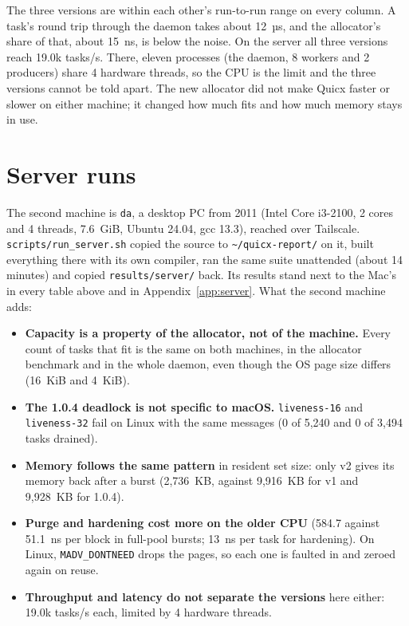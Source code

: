 \documentclass[10.5pt,a4paper]{article}
\newcommand{\file}[1]{\texttt{\small #1}}
\begin{document}
The three versions are within each other's run-to-run range on every column. A task's round trip through the daemon takes about 12~µs, and the allocator's share of that, about 15~ns, is below the noise. On the server all three versions reach 19.0k tasks/s. There, eleven processes (the daemon, 8 workers and 2 producers) share 4 hardware threads, so the CPU is the limit and the three versions cannot be told apart. The new allocator did not make Quicx faster or slower on either machine; it changed how much fits and how much memory stays in use.

\section{Server runs}\label{sec:server}

The second machine is \texttt{da}, a desktop PC from 2011 (Intel Core i3-2100, 2 cores and 4 threads, 7.6~GiB, Ubuntu 24.04, gcc 13.3), reached over Tailscale. \file{scripts/run\_server.sh} copied the source to \file{\textasciitilde/quicx-report/} on it, built everything there with its own compiler, ran the same suite unattended (about 14 minutes) and copied \file{results/server/} back. Its results stand next to the Mac's in every table above and in Appendix~\ref{app:server}. What the second machine adds:
\begin{itemize}
  \item \textbf{Capacity is a property of the allocator, not of the machine.} Every count of tasks that fit is the same on both machines, in the allocator benchmark and in the whole daemon, even though the OS page size differs (16~KiB and 4~KiB).
  \item \textbf{The 1.0.4 deadlock is not specific to macOS.} \texttt{liveness-16} and \texttt{liveness-32} fail on Linux with the same messages (0 of 5,240 and 0 of 3,494 tasks drained).
  \item \textbf{Memory follows the same pattern} in resident set size: only v2 gives its memory back after a burst (2,736~KB, against 9,916~KB for v1 and 9,928~KB for 1.0.4).
  \item \textbf{Purge and hardening cost more on the older CPU} (584.7 against 51.1~ns per block in full-pool bursts; 13~ns per task for hardening). On Linux, \texttt{MADV\_DONTNEED} drops the pages, so each one is faulted in and zeroed again on reuse.
  \item \textbf{Throughput and latency do not separate the versions} here either: 19.0k tasks/s each, limited by 4 hardware threads.
\end{itemize}
\end{document}
